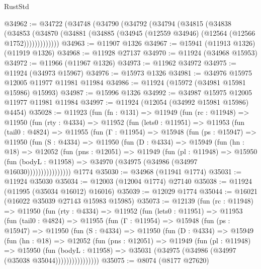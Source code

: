 \begin{lexlean}{RustStd}
\begin{coremodule}
{\begin{coremodule}
{{{{{{{{{{{{{{{{{{{{{{{{{{{{{{{{{{{{{{{{{{{{{{{{{{{{{{{{{{{{{{{{{{{{{{{{{{{{{{{{@34962 := @34722
    (@34748
      (@34790
        (@34792
          (@34794
            (@34815
              (@34838
                (@34853
                  (@34870 (@34881 (@34885 (@34945 (@12559 @34946) (@12564 (@12566 @1752)))))))))))))
@34963 := @11907 @1326
@34967 := @15941 (@11913 @1326) (@11919 @1326)
@34968 := @11928 @27137
@34970 := @11924 (@34968 @15953)
@34972 := @11966 (@11967 @1326)
@34973 := @11962 @34972
@34975 := @11924 (@34973 @15967)
@34976 := @15973 @1326
@34981 := @34976 @15975 @12005 @11977 @11981 @11984
@34986 := @11924 (@15972 (@34981 @15981 @15986) @15993)
@34987 := @15996 @1326
@34992 := @34987 @15975 @12005 @11977 @11981 @11984
@34997 := @11924 (@12054 (@34992 @15981 @15986) @4454)
@35028 := @11923
    (fun (fn : @131) =>
    @11949
      (fun (rc : @11948) =>
      @11950
        (fun (rty : @4334) =>
        @11952
          (fun (lets0 : @11951) =>
          @11953
            (fun (tail0 : @4824) =>
            @11955
              (fun (Γ : @11954) =>
              @15948
                (fun (ps : @15947) =>
                @11950
                  (fun (S : @4334) =>
                  @11950
                    (fun (D : @4334) =>
                    @15949
                      (fun (hn : @18) =>
                      @12052
                        (fun (pns : @12051) =>
                        @11949
                          (fun (pl : @11948) =>
                          @15950
                            (fun (bodyL : @11958) =>
                            @34970 (@34975 (@34986 (@34997 @16030))))))))))))))))
    @1774
@35030 := @34968 (@11941 @1774)
@35031 := @11924 @35030
@35034 := @12003 (@12004 @1774) @27140
@35038 := @11924 (@11995 (@35034 @16012) @16016)
@35039 := @12029 @1774
@35044 := @16021 (@16022 @35039 @27143 @15983 @15985)
@35073 := @12139
    (fun (rc : @11948) =>
    @11950
      (fun (rty : @4334) =>
      @11952
        (fun (lets0 : @11951) =>
        @11953
          (fun (tail0 : @4824) =>
          @11955
            (fun (Γ : @11954) =>
            @15948
              (fun (ps : @15947) =>
              @11950
                (fun (S : @4334) =>
                @11950
                  (fun (D : @4334) =>
                  @15949
                    (fun (hn : @18) =>
                    @12052
                      (fun (pns : @12051) =>
                      @11949
                        (fun (pl : @11948) =>
                        @15950
                          (fun (bodyL : @11958) =>
                          @35031 (@34975 (@34986 (@34997 (@35038 @35044))))))))))))))))
@35075 := @8074 (@8177 @27620)
}}}}}}}}}}}}}}}}}}}}}}}}}}}}}}}}}}}}}}}}}}}}}}}}}}}}}}}}}}}}}}}}}}}}}}}}}}}}}}}}
\end{coremodule}}
\end{coremodule}
\end{lexlean}
